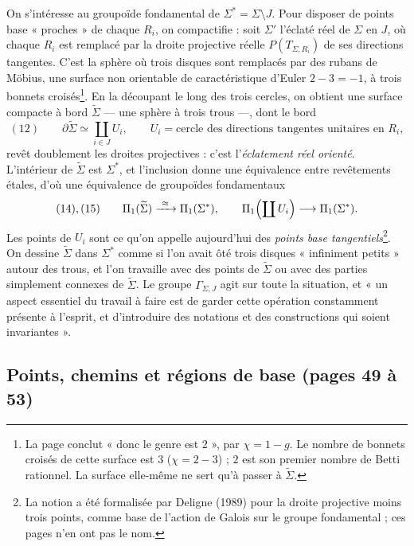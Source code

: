 \documentclass[11pt,a4paper]{article}
\begin{document}
On s'intéresse au groupoïde fondamental de $\Sigma^{*} = \Sigma \setminus J$.
Pour disposer de points base « proches » de chaque $R_i$, on compactifie : soit
$\Sigma'$ l'éclaté réel de $\Sigma$ en $J$, où chaque $R_i$ est remplacé par la
droite projective réelle $P(T_{\Sigma, R_i})$ de ses directions tangentes. C'est
la sphère où trois disques sont remplacés par des rubans de Möbius, une surface
non orientable de caractéristique d'Euler $2 - 3 = -1$, à trois bonnets croisés\footnote{La page conclut
« donc le genre est $2$ », par $\chi = 1 - g$. Le nombre de bonnets croisés de
cette surface est $3$ ($\chi = 2 - 3$) ; $2$ est son premier nombre de Betti
rationnel. La surface elle-même ne sert qu'à passer à $\widetilde\Sigma$.}. En
la découpant le long des trois cercles, on obtient une surface compacte à bord
$\widetilde\Sigma$ — une sphère à trois trous —, dont le bord
\[
(12)\qquad \partial\widetilde\Sigma \simeq \coprod_{i \in J} U_i , \qquad U_i = \text{cercle des directions tangentes unitaires en } R_i ,
\]
revêt doublement les droites projectives : c'est l'\emph{éclatement réel
orienté}. L'intérieur de $\widetilde\Sigma$ est $\Sigma^{*}$, et l'inclusion
donne une équivalence entre revêtements étales, d'où une équivalence de
groupoïdes fondamentaux
\[
(14),(15)\qquad \Pi_1(\widetilde\Sigma) \xrightarrow{\ \approx\ } \Pi_1(\Sigma^{*}), \qquad
\Pi_1\Bigl(\coprod U_i\Bigr) \longrightarrow \Pi_1(\Sigma^{*}) .
\]
Les points de $U_i$ sont ce qu'on appelle aujourd'hui des \emph{points base
tangentiels}\footnote{La notion a été formalisée par Deligne (1989) pour la
droite projective moins trois points, comme base de l'action de Galois sur le
groupe fondamental ; ces pages n'en ont pas le nom.}. On dessine
$\widetilde\Sigma$ dans $\Sigma^{*}$ comme si l'on avait ôté trois disques
« infiniment petits » autour des trous, et l'on travaille avec des points de
$\widetilde\Sigma$ ou avec des parties simplement connexes de
$\widetilde\Sigma$. Le groupe $\Gamma_{\Sigma,J}$ agit sur toute la situation,
et « un aspect essentiel du travail à faire est de garder cette opération
constamment présente à l'esprit, et d'introduire des notations et des
constructions qui soient invariantes ».

\subsection*{Points, chemins et régions de base (pages 49 à 53)}
\end{document}
